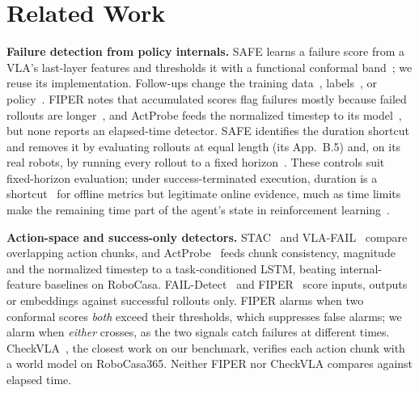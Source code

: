 
\section{Related Work}
\label{sec:related}

\textbf{Failure detection from policy internals.}
SAFE learns a failure score from a VLA's last-layer features and thresholds it with a
functional conformal band~\cite{gu2025safe}; we reuse its implementation. Follow-ups change
the training data~\cite{rajaprakash2026safecast}, labels~\cite{park2026hideseek,ma2026failurespot},
or policy~\cite{soddy2026memoryvla}. FIPER notes that accumulated scores flag failures mostly
because failed rollouts are longer~\cite{romer2025fiper}, and ActProbe feeds the normalized
timestep to its model~\cite{huang2026actprobe}, but none reports an elapsed-time detector. SAFE identifies the duration shortcut and removes it by
evaluating rollouts at equal length (its App.~B.5) and, on its real robots, by running every
rollout to a fixed horizon~\cite{gu2025safe}. These controls suit fixed-horizon evaluation;
under success-terminated execution, duration is a shortcut~\cite{geirhos2020shortcut} for offline
metrics but legitimate online evidence, much as time limits make the remaining time part of the
agent's state in reinforcement learning~\cite{pardo2018timelimits}.

\textbf{Action-space and success-only detectors.}
STAC~\cite{agia2024sentinel} and VLA-FAIL~\cite{seligmann2026vlafail} compare overlapping
action chunks, and ActProbe~\cite{huang2026actprobe} feeds chunk consistency, magnitude and the
normalized timestep to a task-conditioned LSTM, beating internal-feature baselines on RoboCasa. FAIL-Detect~\cite{xu2025faildetect} and
FIPER~\cite{romer2025fiper} score inputs, outputs or embeddings against successful rollouts
only. FIPER alarms when two conformal scores \emph{both} exceed their thresholds, which
suppresses false alarms; we alarm when \emph{either} crosses, as the two signals catch failures
at different times. CheckVLA~\cite{liu2026checkvla}, the closest work on our benchmark,
verifies each action chunk with a world model on RoboCasa365. Neither FIPER nor CheckVLA compares
against elapsed time.

